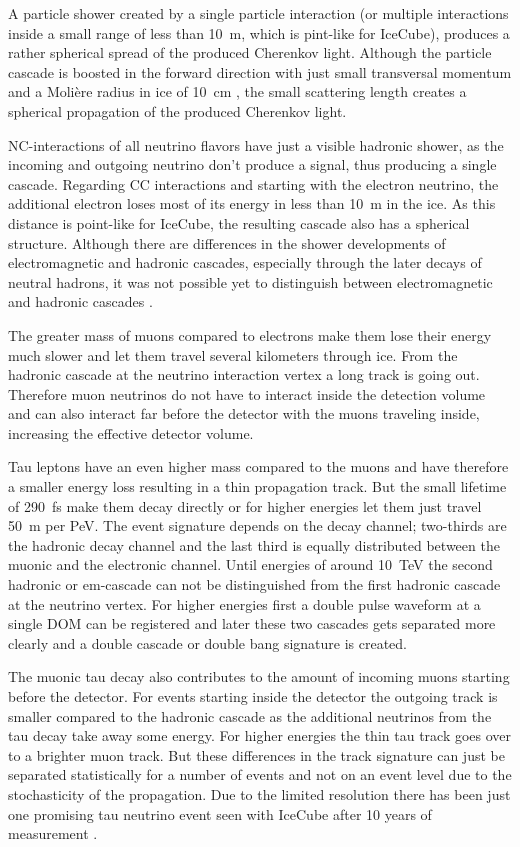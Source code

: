A particle shower created by a single particle interaction (or multiple interactions inside a small range of less than \SI{10}{m}, which is pint-like for IceCube), produces a rather spherical spread of the produced Cherenkov light.
Although the particle cascade is boosted in the forward direction with just small transversal momentum and a Moli\`{e}re radius in ice of \SI{10}{cm} \cite{PDG20}, the small scattering length creates a spherical propagation of the produced Cherenkov light.

NC-interactions of all neutrino flavors have just a visible hadronic shower, as the incoming and outgoing neutrino don't produce a signal, thus producing a single cascade.
Regarding CC interactions and starting with the electron neutrino, the additional electron loses most of its energy in less than \SI{10}{m} in the ice.
As this distance is point-like for IceCube, the resulting cascade also has a spherical structure.
Although there are differences in the shower developments of electromagnetic and hadronic cascades, especially through the later decays of neutral hadrons, it was not possible yet to distinguish between electromagnetic and hadronic cascades \cite{Steuer17ICRC}.

The greater mass of muons compared to electrons make them lose their energy much slower and let them travel several kilometers through ice.
From the hadronic cascade at the neutrino interaction vertex a long track is going out.
Therefore muon neutrinos do not have to interact inside the detection volume and can also interact far before the detector with the muons traveling inside, increasing the effective detector volume.

Tau leptons have an even higher mass compared to the muons and have therefore a smaller energy loss resulting in a thin propagation track.
But the small lifetime of \SI{290}{fs} make them decay directly or for higher energies let them just travel \SI{50}{m} per PeV.
The event signature depends on the decay channel; two-thirds are the hadronic decay channel and the last third is equally distributed between the muonic and the electronic channel.
Until energies of around \SI{10}{TeV} the second hadronic or em-cascade can not be distinguished from the first hadronic cascade at the neutrino vertex.
For higher energies first a double pulse waveform at a single DOM can be registered and later these two cascades gets separated more clearly and a double cascade or double bang signature is created.

The muonic tau decay also contributes to the amount of incoming muons starting before the detector.
For events starting inside the detector the outgoing track is smaller compared to the hadronic cascade as the additional neutrinos from the tau decay take away some energy.
For higher energies the thin tau track goes over to a brighter muon track.
But these differences in the track signature can just be separated statistically for a number of events and not on an event level due to the stochasticity of the propagation.
Due to the limited resolution there has been just one promising tau neutrino event seen with IceCube after 10 years of measurement \cite{Meier19ICRC, IceCube20HeseTau}.

